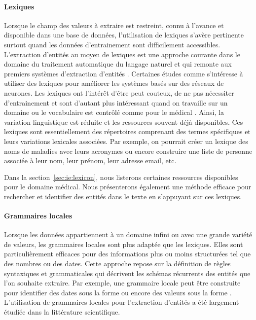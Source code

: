 \paragraph{Lexiques}
Lorsque le champ des valeurs à extraire est restreint, connu à l'avance et disponible dans une base de données, l'utilisation de lexiques s'avère pertinente surtout quand les données d'entrainement sont difficilement accessibles.
L'extraction d'entités au moyen de lexiques est une approche courante dans le domaine du traitement automatique du langage naturel \cite{nasarNamedEntityRecognition2021} et qui remonte aux premiers systèmes d'extraction d'entités \cite{rauExtractingCompanyNames1991}.
Certaines études comme \cite{passosLexiconInfusedPhrase2014} s'intéresse à utiliser des lexiques pour améliorer les systèmes basés sur des réseaux de neurones.
Les lexiques ont l'intérêt d'être peut couteux, de ne pas nécessiter d'entrainement et sont d'autant plus intéressant quand on travaille sur un domaine ou le vocabulaire est contrôlé comme pour le médical \cite{camposBiomedicalNamedEntity2012}.
Ainsi, la variation linguistique est réduite et les ressources souvent déjà disponibles.
Ces lexiques sont essentiellement des répertoires comprenant des termes spécifiques et leurs variations lexicales associées.
Par exemple, on pourrait créer un lexique des noms de maladies avec leurs acronymes ou encore construire une liste de personne associée à leur nom, leur prénom, leur adresse email, etc.

Dans la section~\ref{sec:ie:lexicon}, nous listerons certaines ressources disponibles pour le domaine médical.
Nous présenterons également une méthode efficace pour rechercher et identifier des entités dans le texte en s'appuyant sur ces lexiques.

\paragraph{Grammaires locales}
Lorsque les données appartiennent à un domaine infini ou avec une grande variété de valeurs, les grammaires locales sont plus adaptée que les lexiques.
Elles sont particulièrement efficaces pour des informations plus ou moins structurées tel que des nombres ou des dates.
Cette approche repose sur la définition de règles syntaxiques et grammaticales qui décrivent les schémas récurrents des entités que l'on souhaite extraire.
Par exemple, une grammaire locale peut être construite pour identifier des dates sous la forme  ou encore des valeurs sous la forme .
L'utilisation de grammaires locales pour l'extraction d'entités a été largement étudiée dans la littérature scientifique.


